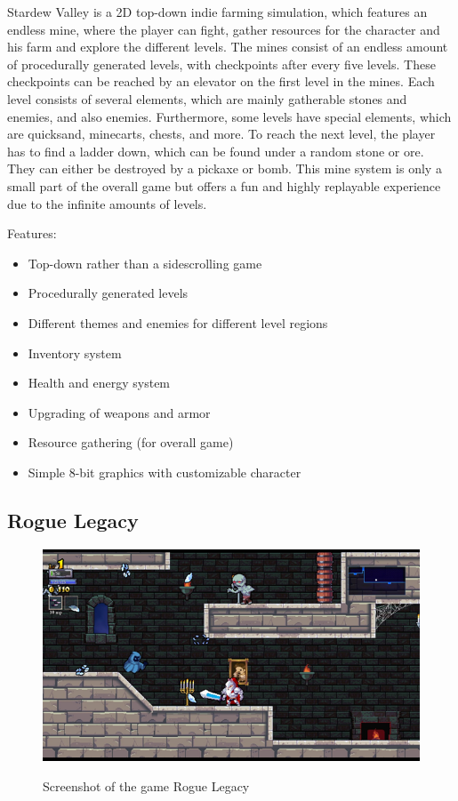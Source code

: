 \documentclass[12p]{article}
\begin{document}
Stardew Valley is a 2D top-down indie farming simulation, which features an endless mine, where the player can fight, gather resources for the character and his farm and explore the different levels. The mines consist of an endless amount of procedurally generated levels, with checkpoints after every five levels. These checkpoints can be reached by an elevator on the first level in the mines. Each level consists of several elements, which are mainly gatherable stones and enemies, and also enemies. Furthermore, some levels have special elements, which are quicksand, minecarts, chests, and more. To reach the next level, the player has to find a ladder down, which can be found under a random stone or ore. They can either be destroyed by a pickaxe or bomb. This mine system is only a small part of the overall game but offers a fun and highly replayable experience due to the infinite amounts of levels.

Features:

\begin{itemize}
    \item Top-down rather than a sidescrolling game
    \item Procedurally generated levels
    \item Different themes and enemies for different level regions
    \item Inventory system
    \item Health and energy system
    \item Upgrading of weapons and armor
    \item Resource gathering (for overall game)
    \item Simple 8-bit graphics with customizable character
\end{itemize}


\subsection{Rogue Legacy}

\begin{figure}[h]
    \center
    \includegraphics[width=1\textwidth]{StateOfTheArtScreenshots/rogue_legacy}
    \label{StateOfTheArt_Screenshots_RogueLegacy}
    \caption{Screenshot of the game Rogue Legacy \cite{RogueLegacyScreenshot}}
\end{figure}
\end{document}
